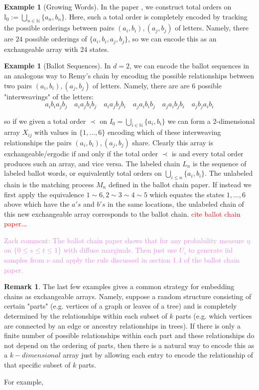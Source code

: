 \documentclass[11pt,oneside,reqno]{article}
\theoremstyle{plain}
\theoremstyle{definition}
\newtheorem{example}[theorem]{Example}
\newtheorem{remark}[theorem]{Remark}
\numberwithin{equation}{section}
\renewcommand{\cite}{\citet}
\renewcommand{\leq}{\leqslant}
\newcommand{\N}{\mathbb{N}}
\newcommand{\red}{\textcolor{red}}
\newcommand{\zack}[1]{\textcolor{Violet}{Zack comment: #1}}
\begin{document}
\begin{example}[Growing Words]
In the paper \cite{choi2016doobmartincompactificationmarkovchain}, we construct total orders on $\mathbb{I}_0 := \bigcup_{n \in \N} \{a_n, b_n\}$. Here, such a total order is completely encoded by tracking the possible orderings between pairs $(a_i, b_i), (a_j, b_j)$ of letters. Namely, there are $24$ possible orderings of $\{a_i, b_i, a_j, b_j\}$, so we can encode this as an exchangeable array with 24 states.
\end{example}

\begin{example}[Ballot Sequences]
In $d=2$, we can encode the ballot sequences in an analogous way to Remy's chain by encoding the possible relationships between two pairs $(a_i, b_i), (a_j,b_j)$ of letters. Namely, there are are 6 possible "interweavings" of the letters:
%
\[a_ib_ia_jb_j \quad a_i a_j b_i b_j \quad a_i a_j b_j b_i \quad a_j a_i b_i b_j \quad a_j a_i b_j b_i \quad a_j b_j a_i b_i\]

\noindent so if we given a total order $\prec$ on $I_0 = \bigcup_{i \in \N} \{a_i, b_i\}$ we can form a 2-dimensional array $X_{ij}$ with values in $\{1,...,6\}$ encoding which of these interweaving relationships the pairs $(a_i, b_i), (a_j, b_j)$ share. Clearly this array is exchangeable/ergodic if and only if the total order $\prec$ is and every total order produces such an array, and vice versa. The labeled chain $L_n$ is the sequence of labeled ballot words, or equivalently total orders on $\bigcup_{i\leq n} \{a_i, b_i\}$. The unlabeled chain is the matching process $M_n$ defined in the ballot chain paper. If instead we first apply the equivalence $1 \sim 6, 2 \sim 3 \sim 4 \sim 5$ which equates the states $1,...,6$ above which have the $a's$ and $b's$ in the same locations, the unlabeled chain of this new exchangeable array corresponds to the ballot chain. \red{cite ballot chain paper...}
\end{example}

\zack{The ballot chain paper shows that for any probability measure $\eta$ on $\{0 \leq s \leq t \leq 1$\} with diffuse marginals. Then just use $U_i$ to generate iid samples from $\nu$ and apply the rule discussed in section 1.4 of the ballot chain paper.}

\begin{remark}
The last few examples gives a common strategy for embedding chains as exchangeable arrays. Namely, suppose a random structure consisting of certain "parts" (e.g. vertices of a graph or leaves of a tree) and is completely determined by the relationships within each subset of $k$ parts (e.g. which vertices are connected by an edge or ancestry relationships in trees). If there is only a finite number of possible relationships within each part and these relationships do not depend on the ordering of parts, then there is a natural way to encode this as a $k-dimensional$ array just by allowing each entry to encode the relationship of that specific subset of $k$ parts.



 For example, \cite{Marckert_generating_d-ary}
\end{remark} 
\end{document}
